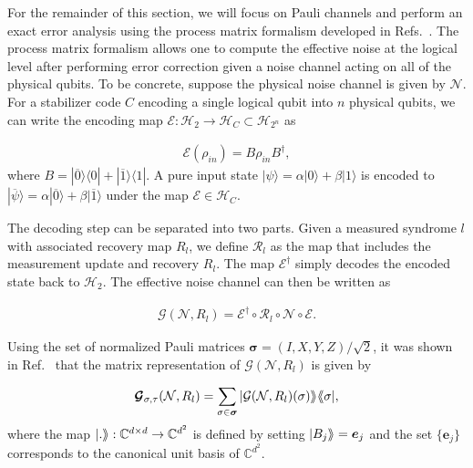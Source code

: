\documentclass[pra,longbibliography,twocolumn,showpacs,nofootinbib,superscriptaddress,notitlepage]{revtex4-1}
\newcommand{\CPLX}{\mathbb{C}}
\newcommand{\ket}[1]{|#1\rangle}  %
\newcommand{\dla}{\ensuremath{\langle\hspace{-.25em}\langle}}
\newcommand{\dra}{\ensuremath{\rangle\hspace{-.25em}\rangle}}
\begin{document}
For the remainder of this section, we will focus on Pauli channels and perform an exact error analysis using the process matrix formalism developed in Refs.~\cite{RDM02,CWBL16}. The process matrix formalism allows one to compute the effective noise at the logical level after performing error correction given a noise channel acting on all of the physical qubits. To be concrete, suppose the physical noise channel is given by $\mathcal{N}$. For a stabilizer code $C$ encoding a single logical qubit into $n$ physical qubits, we can write the encoding map $\mathcal{E}: \mathcal{H}_{2} \to \mathcal{H}_{C}\subset \mathcal{H}_{2^{n}}$ as

\begin{align}
\mathcal{E}(\rho_{in})=B\rho_{in}B^{\dagger},
\label{eq:EncodingMap}
\end{align}
where $B=\ket{\overline{0}} \langle 0| + \ket{\overline{1}} \langle 1|$. A pure input state $\ket{\psi} = \alpha \ket{0} + \beta \ket{1}$ is encoded to $\ket{\overline{\psi}} = \alpha \ket{\overline{0}} + \beta \ket{\overline{1}}$ under the map $\mathcal{E} \in \mathcal{H}_{C}$.

The decoding step can be separated into two parts. Given a measured syndrome $l$ with associated recovery map $R_{l}$, we define $\mathcal{R}_{l}$ as the map that includes the measurement update and recovery $R_{l}$. The map $\mathcal{E}^{\dagger}$ simply decodes the encoded state back to $\mathcal{H}_{2}$. The effective noise channel can then be written as 

\begin{align}
\mathcal{G}(\mathcal{N},R_{l}) = \mathcal{E}^{\dagger} \circ \mathcal{R}_{l} \circ \mathcal{N} \circ \mathcal{E}.
\label{eq:EffectiveChannel}
\end{align}

Using the set of normalized Pauli matrices $\boldsymbol{\sigma} = (I,X,Y,Z)/\sqrt{2}$, it was shown in Ref.~\cite{CWBL16} that the matrix representation of $\mathcal{G}(\mathcal{N},R_{l})$ is given by

\begin{align}
\boldsymbol{\mathcal{G}}_{\sigma,\tau}(\mathcal{N},R_{l}) = \sum_{\sigma \in \boldsymbol{\sigma}} |\mathcal{G}(\mathcal{N},R_{l})(\sigma) \dra \dla \sigma |,
\label{eq:MatrixRepresentationG}
\end{align}
where the map $|.\dra:\CPLX^{d\times d}\to\CPLX^{d^2}$ is defined by setting $|B_{j} \dra = \boldsymbol{e}_{j}$ and the set $\{ \boldsymbol{e}_{j} \}$ corresponds to the canonical unit basis of $\CPLX^{d^{2}}$.
\end{document}
